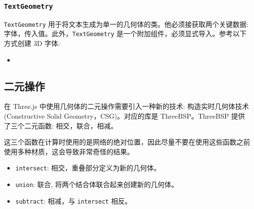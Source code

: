 \subsubsection*{\texttt{TextGeometry}}

\texttt{TextGeometry} 用于将文本生成为单一的几何体的类。他必须接获取两个关键数据: 字体，传入值。此外，\texttt{TextGeometry} 是一个附加组件，必须显式导入。参考以下方式创建 3D 字体:
\begin{itemize}
  \item {}
\end{itemize}

\subsection{二元操作}

在 Three.js 中使用几何体的二元操作需要引入一种新的技术: 构造实时几何体技术(Constructive Solid Geometry，CSG)。对应的库是 ThreeBSP。ThreeBSP 提供了三个二元函数: 相交，联合，相减。

这三个函数在计算时使用的是网络的绝对位置，因此尽量不要在使用这些函数之前使用多种材质，这会导致非常奇怪的结果。

\begin{itemize}
  \item \texttt{intersect}: 相交，重叠部分定义为新的几何体。
  \item \texttt{union}: 联合, 将两个结合体联合起来创建新的几何体。
  \item \texttt{subtract}: 相减，与 \texttt{intersect} 相反。
\end{itemize}

\newpage